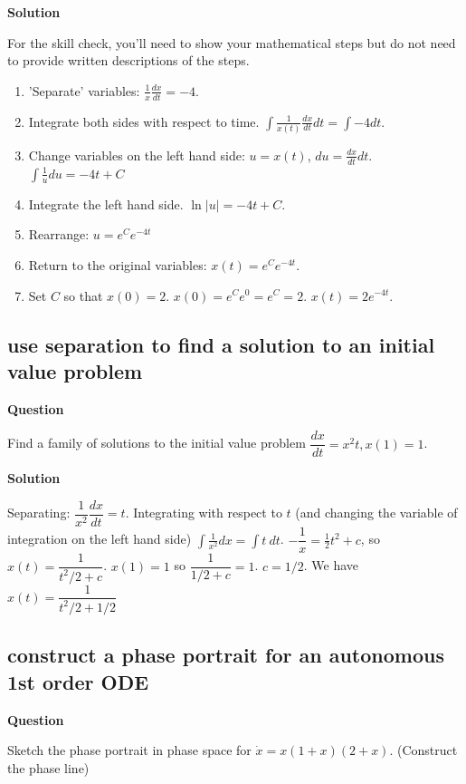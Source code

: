\documentclass[12pt,letterpaper,noanswers]{exam}
\begin{document}
\noindent\textbf{Solution}


For the skill check, you'll need to show your mathematical steps but do not need to provide written descriptions of the steps.

\begin{enumerate}
    \item 'Separate' variables: $\frac{1}{x}\frac{dx}{dt} = -4$.
    \item Integrate both sides with respect to time.  $\displaystyle\int \frac{1}{x(t)}\frac{dx}{dt}dt = \int -4 dt$.
    \item Change variables on the left hand side: $u = x(t)$, 
    $du = \frac{dx}{dt}dt$.  
    $\int \frac{1}{u}du = -4t + C$
    \item Integrate the left hand side.  $\ln \vert u\vert = -4t + C$.
    \item Rearrange: $u = e^Ce^{-4t}$
    \item Return to the original variables: $x(t) = e^Ce^{-4t}$.
    \item Set $C$ so that $x(0) = 2$.  $x(0) = e^Ce^{0} = e^C = 2$.  $x(t) = 2e^{-4t}$. 
\end{enumerate}



\subsection{use separation to find a solution to an initial value problem}
\noindent\textbf{Question}

Find a family of solutions to the initial value problem $\dfrac{dx}{dt} = x^2t, x(1) = 1$.

\noindent\textbf{Solution}

Separating: $\dfrac{1}{x^2} \dfrac{dx}{dt} = t$.  Integrating with respect to $t$ (and changing the variable of integration on the left hand side) $\displaystyle\int \frac{1}{x^2} dx = \int t\ dt$.  $-\dfrac{1}{x} = \frac{1}{2}t^2 + c$, so $x(t) = \dfrac{1}{t^2/2 + c}$.  $x(1) = 1$ so $\dfrac{1}{1/2 + c} = 1$.  $c = 1/2$.  We have $x(t) = \dfrac{1}{t^2/2 + 1/2}$



\subsection{construct a phase portrait for an autonomous 1st order ODE}
\noindent\textbf{Question}

Sketch the phase portrait in phase space for $\dot x = x(1+x)(2+x)$.  (Construct the phase line)
\end{document}

